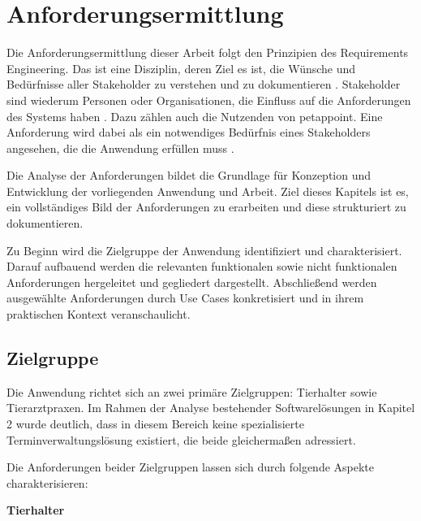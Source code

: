 \chapter{Anforderungsermittlung}

Die Anforderungsermittlung dieser Arbeit folgt den Prinzipien des Requirements Engineering. Das ist eine Disziplin, deren Ziel es ist, die Wünsche und Bedürfnisse aller Stakeholder zu verstehen und zu dokumentieren \cite[S.~3]{pohl2021}. Stakeholder sind wiederum Personen oder Organisationen, die Einfluss auf die Anforderungen des Systems haben \cite[S.~2]{pohl2021}. Dazu zählen auch die Nutzenden von petappoint. Eine Anforderung wird dabei als ein notwendiges Bedürfnis eines Stakeholders angesehen, die die Anwendung erfüllen muss \cite[S.~1]{pohl2021}.

Die Analyse der Anforderungen bildet die Grundlage für Konzeption und Entwicklung der vorliegenden Anwendung und Arbeit. Ziel dieses Kapitels ist es, ein vollständiges Bild der Anforderungen zu erarbeiten und diese strukturiert zu dokumentieren.

Zu Beginn wird die Zielgruppe der Anwendung identifiziert und charakterisiert. Darauf aufbauend werden die relevanten funktionalen sowie nicht funktionalen Anforderungen hergeleitet und gegliedert dargestellt. Abschließend werden ausgewählte Anforderungen durch Use Cases konkretisiert und in ihrem praktischen Kontext veranschaulicht.

\section{Zielgruppe}
Die Anwendung richtet sich an zwei primäre Zielgruppen: Tierhalter sowie Tierarztpraxen. Im Rahmen der Analyse bestehender Softwarelösungen in Kapitel 2 wurde deutlich, dass in diesem Bereich keine spezialisierte Terminverwaltungslösung existiert, die beide gleichermaßen adressiert.

Die Anforderungen beider Zielgruppen lassen sich durch folgende Aspekte charakterisieren:

\textbf{Tierhalter}

